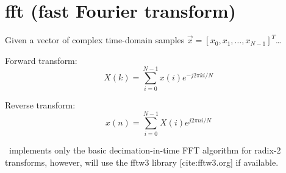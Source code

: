 % 
%

\section{fft (fast Fourier transform)}
\label{module:fft}

Given a vector of complex time-domain samples
$\vec{x} = \left[x_0,x_1,\ldots,x_{N-1}\right]^T$\ldots

Forward transform:
\[
    X(k) = \sum_{i=0}^{N-1}{x(i) e^{-j 2 \pi k i/N}}
\]

Reverse transform:
\[
    x(n) = \sum_{i=0}^{N-1}{X(i) e^{ j 2 \pi n i/N}}
\]

\liquid\ implements only the basic decimation-in-time FFT algorithm for
radix-2 transforms, however, will use the fftw3 library [cite:fftw3.org] if
available.

